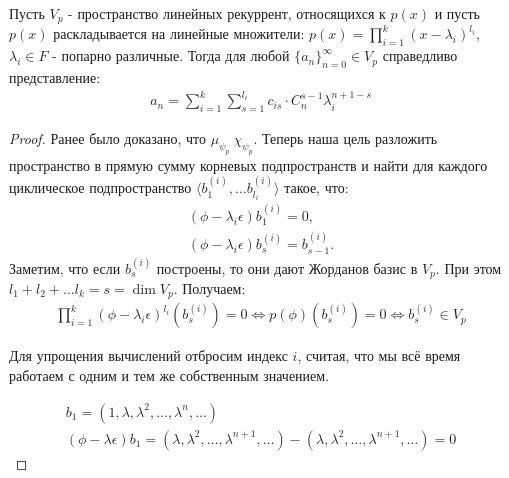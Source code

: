 
\begin{theorem}
    Пусть $V_p$ - пространство линейных рекуррент, относящихся к $p(x)$ и пусть $p(x)$ 
    раскладывается на линейные множители: $p(x) = \displaystyle\prod_{i=1}^{k}(x -\lambda_i)^{l_i}$,
    $\lambda_i \in F$ - попарно различные.
    Тогда для любой $\{a_n\}_{n=0}^{\infty} \in V_p$ справедливо представление:
    \begin{gather*}
        a_n = \sum_{i=1}^{k}\sum_{s=1}^{l_i} c_{is} \cdot C_n^{s - 1} \lambda_i^{n + 1 - s}
    \end{gather*}
\end{theorem}

\begin{proof}
    Ранее было доказано, что $\mu_{\psi_p} ~ \chi_{\psi_p}$. Теперь наша цель разложить пространство 
    в прямую сумму корневых подпространств и найти для каждого циклическое подпространство 
    $\langle b_1^{(i)}, \dots b_{l_i}^{(i)} \rangle$ такое, что:
    \begin{gather*}
        (\phi - \lambda_i \epsilon)b_1^{(i)} = 0, \\
        (\phi - \lambda_i \epsilon) b_{s}^{(i)} = b_{s-1}^{(i)}.
    \end{gather*}
    Заметим, что если $b_s^{(i)}$ построены, то они дают Жорданов базис в $V_p$. 
    При этом $l_1 + l_2 +\dots l_k = s = \dim V_p$. Получаем:
    \begin{gather*}
        \prod_{i=1}^{k}(\phi - \lambda_i \epsilon)^{l_i} (b_s^{(i)}) = 0 \Leftrightarrow p(\phi) (b_s^{(i)}) = 0 \Leftrightarrow b_s^{(i)} \in V_p
    \end{gather*}

    Для упрощения вычислений отбросим индекс $i$, считая, что мы всё время работаем с одним и тем же собственным значением.

    \begin{gather*}
        b_1 = (1, \lambda, \lambda^2, \dots, \lambda^n, \dots) \\
        (\phi - \lambda \epsilon)b_1 = (\lambda, \lambda^2, \dots, \lambda^{n + 1}, \dots) - (\lambda, \lambda^2, \dots, \lambda^{n + 1}, \dots) = 0
    \end{gather*}


\end{proof}
